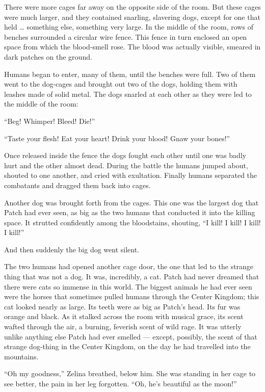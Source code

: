 \documentclass[ebook,oneside,openany,17pt]{memoir}
\newenvironment{tolerant}[1]{%
  \par\tolerance=#1\relax
}{%
  \par
}
\begin{document}
There were more cages far away on the opposite side of the room. But
these cages were much larger, and they contained snarling, slavering
dogs, except for one that held … something else, something very
large. In the middle of the room, rows of benches surrounded a
circular wire fence. This fence in turn enclosed an open space from
which the blood-smell rose. The blood was actually visible, smeared in
dark patches on the ground.

Humans began to enter, many of them, until the benches were full. Two
of them went to the dog-cages and brought out two of the dogs, holding
them with leashes made of solid metal. The dogs snarled at each other
as they were led to the middle of the room:

“Beg! Whimper! Bleed! Die!”

\begin{tolerant}{2000}
“Taste your flesh! Eat your heart! Drink your blood! Gnaw your bones!”
\end{tolerant}

Once released inside the fence the dogs fought each other until one
was badly hurt and the other almost dead. During the battle the humans
jumped about, shouted to one another, and cried with
exultation. Finally humans separated the combatants and dragged them
back into cages.

Another dog was brought forth from the cages. This one was the largest
dog that Patch had ever seen, as big as the two humans that conducted
it into the killing space. It strutted confidently among the
bloodstains, shouting, “I kill! I kill! I kill! I kill!”

And then suddenly the big dog went silent.

The two humans had opened another cage door, the one that led to the
strange thing that was not a dog. It was, incredibly, a cat. Patch had
never dream\-ed that there were cats so immense in this world. The
biggest animals he had ever seen were the horses that sometimes pulled
humans through the Center Kingdom; this cat looked nearly as
large. Its teeth were as big as Patch’s head. Its fur was orange and
black. As it stalked across the room with musical grace, its scent
wafted through the air, a burning, feverish scent of wild rage. It was
utterly unlike anything else Patch had ever smelled — except,
possibly, the scent of that strange dog-thing in the Center Kingdom,
on the day he had travelled into the mountains.

“Oh my goodness,” Zelina breathed, below him. She was standing in her
cage to see better, the pain in her leg forgotten. “Oh, he’s beautiful
as the moon!”
\end{document}
